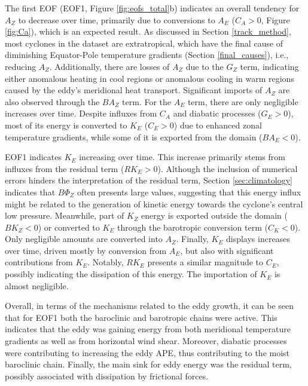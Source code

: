 The first EOF (EOF1, Figure \ref{fig:eofs_total}b) indicates an overall tendency for $A_Z$ to decrease over time, primarily due to conversions to $A_E$ ($C_A > 0$, Figure \ref{fig:Ca}), which is an expected result. As discussed in Section \ref{track_method}, most cyclones in the dataset are extratropical, which have the final cause of diminishing Equator-Pole temperature gradients (Section \ref{final_causes}), i.e., reducing $A_Z$. Additionally, there are losses of $A_Z$ due to the $G_Z$ term, indicating either anomalous heating in cool regions or anomalous cooling in warm regions caused by the eddy's meridional heat transport. Significant imports of $A_Z$ are also observed through the $BA_Z$ term. For the $A_E$ term, there are only negligible increases over time. Despite influxes from $C_A$ and diabatic processes ($G_E > 0$), most of its energy is converted to $K_E$ ($C_E > 0$) due to enhanced zonal temperature gradients, while some of it is exported from the domain ($BA_E < 0$).

EOF1 indicates $K_E$ increasing over time. This increase primarily stems from influxes from the residual term ($RK_E > 0$). Although the inclusion of numerical errors hinders the interpretation of the residual term, Section \ref{sec:climatology} indicates that $B\Phi_Z$ often presents large values, suggesting that this energy influx might be related to the generation of kinetic energy towards the cyclone's central low pressure. Meanwhile, part of $K_Z$ energy is exported outside the domain ($BK_Z < 0$) or converted to $K_E$ through the barotropic conversion term ($C_K < 0$). Only negligible amounts are converted into $A_Z$. Finally, $K_E$ displays increases over time, driven mostly by conversion from $A_E$, but also with significant contributions from $K_E$. Notably, $RK_E$ presents a similar magnitude to $C_E$, possibly indicating the dissipation of this energy. The importation of $K_E$ is almost negligible.

Overall, in terms of the mechanisms related to the eddy growth, it can be seen that for EOF1 both the baroclinic and barotropic chains were active. This indicates that the eddy was gaining energy from both meridional temperature gradients as well as from horizontal wind shear. Moreover, diabatic processes were contributing to increasing the eddy APE, thus contributing to the moist baroclinic chain. Finally, the main sink for eddy energy was the residual term, possibly associated with dissipation by frictional forces.

